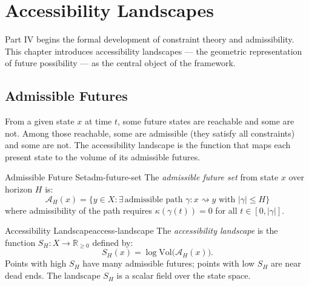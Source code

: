 
\chapter{Accessibility Landscapes}



Part IV begins the formal development of constraint theory and admissibility.
This chapter introduces accessibility landscapes — the geometric representation
of future possibility — as the central object of the framework.

\section{Admissible Futures}

From a given state $x$ at time $t$, some future states are reachable
and some are not. Among those reachable, some are admissible (they satisfy
all constraints) and some are not. The accessibility landscape is the
function that maps each present state to the volume of its admissible futures.

\begin{definition}{Admissible Future Set}{adm-future-set}
  The \emph{admissible future set} from state $x$ over horizon $H$ is:
  \[
    \mathcal{A}_H(x) = \{y \in X : \exists\,\text{admissible path }
    \gamma : x \rightsquigarrow y \text{ with } |\gamma| \leq H\}
  \]
  where admissibility of the path requires $\kappa(\gamma(t)) = 0$ for
  all $t \in [0, |\gamma|]$.
\end{definition}

\begin{definition}{Accessibility Landscape}{access-landscape}
  The \emph{accessibility landscape} is the function
  $S_H : X \to \mathbb{R}_{\geq 0}$ defined by:
  \[
    S_H(x) = \log \mathrm{Vol}\bigl(\mathcal{A}_H(x)\bigr).
  \]
  Points with high $S_H$ have many admissible futures; points with low $S_H$
  are near dead ends. The landscape $S_H$ is a scalar field over the
  state space.
\end{definition}

